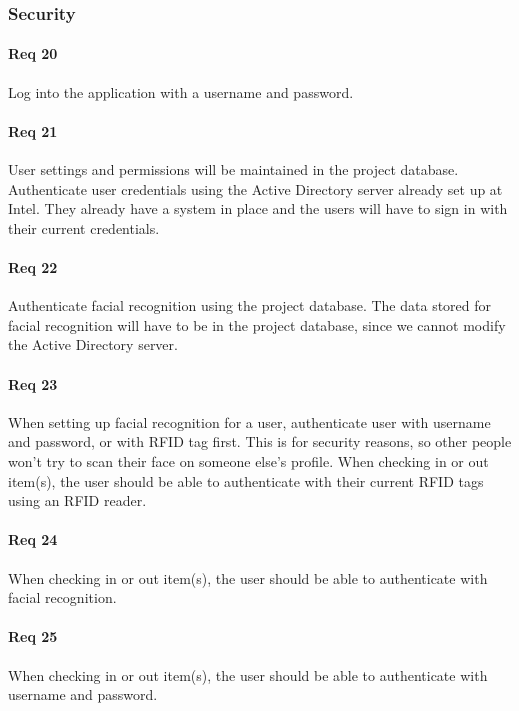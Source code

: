 \documentclass[10pt, onecolumn, twoside, peerreview]{IEEEtran}
\begin{document}
\subsubsection{Security}
\paragraph*{Req 20} Log into the application with a username and password.\\

\paragraph*{Req 21} User settings and permissions will be maintained in the project database. Authenticate user credentials using the
Active Directory server already set up at Intel. They already have a system in place and the users will have to sign in
with their current credentials.\\

\paragraph*{Req 22} Authenticate facial recognition using the project database. The data stored for facial recognition will have to be in
the project database, since we cannot modify the Active Directory server.\\

\paragraph*{Req 23} When setting up facial recognition for a user, authenticate user with username and password, or with RFID tag first.
This is for security reasons, so other people won’t try to scan their face on someone else’s profile. When checking in
or out item(s), the user should be able to authenticate with their current RFID tags using an RFID reader.\\

\paragraph*{Req 24} When checking in or out item(s), the user should be able to authenticate with facial recognition.\\

\paragraph*{Req 25} When checking in or out item(s), the user should be able to authenticate with username and password.\\
\end{document}
